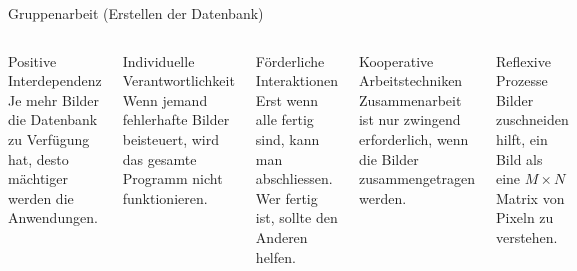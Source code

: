 \documentclass[10pt,aspectratio=169]{beamer}
\begin{document}
\begin{frame}[fragile]{Gruppenarbeit (Erstellen der Datenbank)}
	\begin{columns}[T,onlytextwidth]
		\column{\textwidth}
		\begin{block}{Positive Interdependenz}
			Je mehr Bilder die Datenbank zu Verfügung hat, desto mächtiger werden die Anwendungen.
		\end{block}
		\begin{block}{Individuelle Verantwortlichkeit}
			Wenn jemand fehlerhafte Bilder beisteuert, wird das gesamte Programm nicht funktionieren.
		\end{block}
		\begin{block}{Förderliche Interaktionen}
			Erst wenn alle fertig sind, kann man abschliessen.
			Wer fertig ist, sollte den Anderen helfen.
		\end{block}
		\begin{block}{Kooperative Arbeitstechniken}
			Zusammenarbeit ist nur zwingend erforderlich, wenn die Bilder zusammengetragen werden.
		\end{block}
		\begin{block}{Reflexive Prozesse}
			Bilder zuschneiden hilft, ein Bild als eine $M\times N$ \glqq{}Matrix\grqq{} von Pixeln zu verstehen.
		\end{block}
	\end{columns}
\end{frame}
\end{document}
